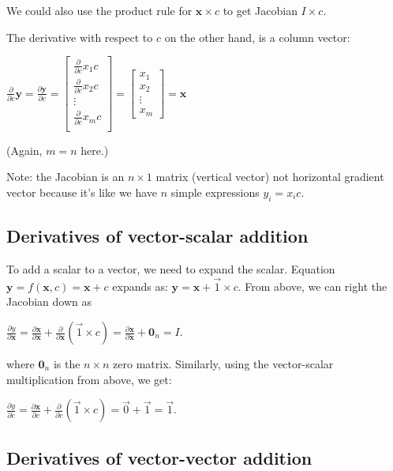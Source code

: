 \documentclass[11pt]{article}
\begin{document}
We could also use the product rule for $\mathbf{x} \times c$ to get Jacobian $I \times c$.
 
The derivative with respect to $c$ on the other hand, is a column vector:

$\frac{\partial}{\partial c} \mathbf{y} = \frac{\partial \mathbf{y}}{\partial c} = \begin{bmatrix}
           \frac{\partial}{\partial c} x_{1} c \\
           \frac{\partial}{\partial c} x_{2} c \\
           \vdots \\
           \frac{\partial}{\partial c} x_{m} c \\
         \end{bmatrix} = \begin{bmatrix}
           x_{1} \\
           x_{2} \\
           \vdots \\
           x_{m} 
         \end{bmatrix} = \mathbf{x}$

(Again, $m=n$ here.)

Note: the Jacobian is an $n \times 1$ matrix (vertical vector) not horizontal gradient vector because it's like we have $n$ simple expressions $y_i = x_i c$.

\subsection{Derivatives of vector-scalar addition}

To add a scalar to a vector, we need to expand the scalar.  Equation $\mathbf{y} = f(\mathbf{x},c) = \mathbf{x} + c$ expands as: $\mathbf{y} = \mathbf{x} + \vec{1} \times c$.  From above, we can right the Jacobian down as

$
\frac{\partial y}{\partial {\mathbf{x}}} = \frac{\partial \mathbf{x}}{\partial \mathbf{x}} + \frac{\partial}{\partial \mathbf{x}}(\vec{1}\times c) =  \frac{\partial \mathbf{x}}{\partial \mathbf{x}} + \mathbf{0}_n = I.
$

where $\mathbf{0}_{n}$ is the $n \times n$ zero matrix. Similarly, using the vector-scalar multiplication from above, we get:

$\frac{\partial y}{\partial c} = \frac{\partial \mathbf{x}}{\partial c} + \frac{\partial}{\partial c} (\vec{1} \times c) = \vec{0} + \vec{1} = \vec{1}$.

\subsection{Derivatives of vector-vector addition}
\end{document}
